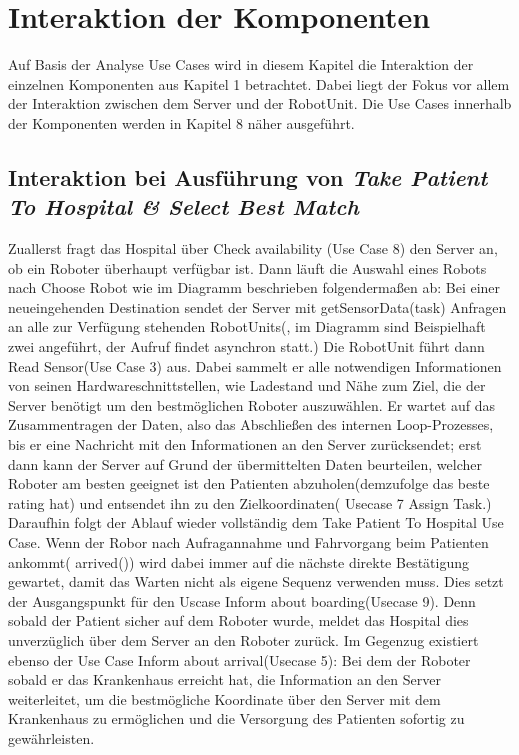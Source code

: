 \section{Interaktion der Komponenten}
Auf Basis der Analyse Use Cases wird in diesem Kapitel die Interaktion der einzelnen Komponenten aus Kapitel 1 betrachtet. Dabei liegt der Fokus vor allem der Interaktion zwischen dem Server und der RobotUnit. Die Use Cases innerhalb der Komponenten werden in Kapitel 8 näher ausgeführt. \\


\subsection*{Interaktion bei Ausführung von \emph{Take Patient To Hospital & Select Best Match}}

Zuallerst fragt das Hospital über Check availability (Use Case 8) den Server an, ob ein Roboter überhaupt verfügbar ist. Dann läuft die Auswahl eines Robots nach Choose Robot wie im Diagramm beschrieben folgendermaßen ab: Bei einer neueingehenden Destination sendet der Server mit getSensorData(task) Anfragen an alle zur Verfügung stehenden RobotUnits(, im Diagramm sind Beispielhaft zwei angeführt, der Aufruf findet asynchron statt.) Die RobotUnit führt dann Read Sensor(Use Case 3) aus. Dabei sammelt er alle notwendigen Informationen von seinen Hardwareschnittstellen, wie Ladestand und Nähe zum Ziel, die der Server benötigt um den bestmöglichen Roboter auszuwählen. Er wartet auf das Zusammentragen der Daten, also das Abschließen des internen Loop-Prozesses, bis er eine Nachricht mit den Informationen an den Server zurücksendet; erst dann kann der Server auf Grund der übermittelten Daten beurteilen, welcher Roboter am besten geeignet ist den Patienten abzuholen(demzufolge das beste rating hat) und entsendet ihn zu den Zielkoordinaten( Usecase 7 Assign Task.) Daraufhin folgt der Ablauf wieder vollständig dem Take Patient To Hospital Use Case. Wenn der Robor nach Aufragannahme und Fahrvorgang beim Patienten ankommt( arrived()) wird dabei immer auf die nächste direkte Bestätigung gewartet, damit das Warten nicht als eigene Sequenz verwenden muss. Dies setzt der Ausgangspunkt für den Uscase Inform about boarding(Usecase 9). Denn sobald der Patient sicher auf dem Roboter wurde, meldet das Hospital dies unverzüglich über dem Server an den Roboter zurück. Im Gegenzug existiert ebenso der Use Case Inform about arrival(Usecase 5): Bei dem der Roboter sobald er das Krankenhaus erreicht hat, die Information an den Server weiterleitet, um die bestmögliche Koordinate über den Server mit dem Krankenhaus zu ermöglichen und die Versorgung des Patienten sofortig zu gewährleisten.

